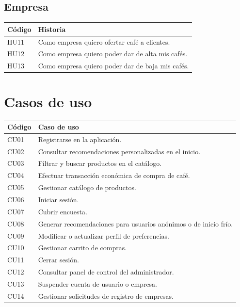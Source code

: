 \subsection{Empresa}
\begin{longtable}{p{1.5cm}p{14.5cm}}
\hline\textbf{Código}&\textbf{Historia}\\\hline
HU11&Como empresa quiero ofertar café a clientes.\\
HU12&Como empresa quiero poder dar de alta mis cafés.\\
HU13&Como empresa quiero poder dar de baja mis cafés.\\
\hline
\end{longtable}

\section{Casos de uso}
\begin{longtable}{p{2cm}p{14cm}}
\hline\textbf{Código}&\textbf{Caso de uso}\\\hline
CU01&Registrarse en la aplicación.\\
CU02&Consultar recomendaciones personalizadas en el inicio.\\
CU03&Filtrar y buscar productos en el catálogo.\\
CU04&Efectuar transacción económica de compra de café.\\
CU05&Gestionar catálogo de productos.\\
CU06&Iniciar sesión.\\
CU07&Cubrir encuesta.\\
CU08&Generar recomendaciones para usuarios anónimos o de inicio frío.\\
CU09&Modificar o actualizar perfil de preferencias.\\
CU10&Gestionar carrito de compras.\\
CU11&Cerrar sesión.\\
CU12&Consultar panel de control del administrador.\\
CU13&Suspender cuenta de usuario o empresa.\\
CU14&Gestionar solicitudes de registro de empresas.\\
\hline
\end{longtable}

